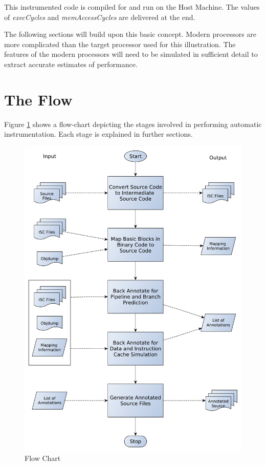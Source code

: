 This instrumented code is compiled for and run on the Host Machine. The values of \emph{execCycles} and \emph{memAccessCycles} are delivered at the end. 

The following sections will build upon this basic concept. Modern processors are more complicated than the target processor used for this illustration. The features of the modern processors will need to be simulated in sufficient detail to extract accurate estimates of performance.

\section{The Flow}

Figure \ref{fig:hcsFlowChart} shows a flow-chart depicting the stages involved in performing automatic instrumentation. Each stage is explained in further sections.

\begin{figure}[h!]
\center
\includegraphics[width=.9\textwidth]{figures/HCS_FlowChart.pdf}
\caption{Flow Chart}
\label{fig:hcsFlowChart}
\end{figure}

